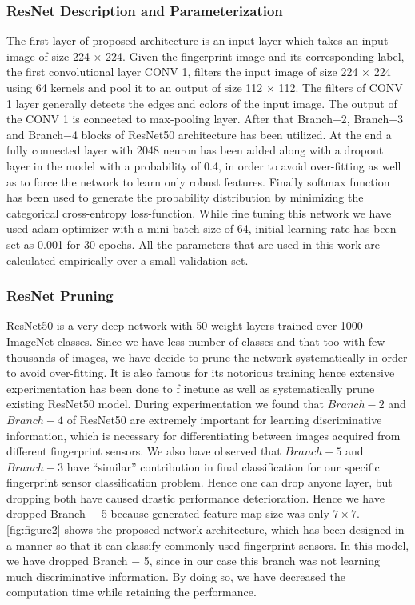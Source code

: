 \subsubsection{ResNet Description and Parameterization}
The first layer of proposed architecture is an input layer which takes an input image of size 224 $\times$ 224. Given the fingerprint image and its corresponding label, the first convolutional layer CONV 1, filters the input image of size 224 $\times$ 224 using 64 kernels and pool it to an output of size 112 $\times$ 112. The filters of CONV 1 layer generally detects the edges and colors of the input image. The output of the CONV 1 is connected to max-pooling layer. After that Branch−2, Branch−3 and Branch−4 blocks of ResNet50 architecture has been utilized. At the end a fully connected layer with 2048 neuron has been added along with a dropout layer in the model with a probability of 0.4, in order to avoid over-fitting as well as to force the network to learn only robust features. Finally softmax function has been used to generate the probability distribution by minimizing the categorical cross-entropy loss-function. While fine tuning this network we have used adam optimizer with a mini-batch size of 64, initial learning rate has been set as 0.001 for 30 epochs. All the parameters that are used in this work are calculated empirically over a small validation set.

\subsubsection{ResNet Pruning}
ResNet50 is a very deep network with 50 weight layers trained over 1000 ImageNet classes. Since we have less number of classes and that too with few thousands of images, we have decide to prune the network systematically in order to avoid over-fitting. It is also famous for its notorious training hence extensive experimentation has been done to f inetune as well as systematically prune existing ResNet50 model. During experimentation we found that $Branch−2$ and $Branch−4$ of ResNet50 are extremely important for learning discriminative information, which is necessary for differentiating between images acquired from different fingerprint sensors. We also
have observed that $Branch−5$ and $Branch−3$ have “similar” contribution in final classification for our specific fingerprint sensor classification problem. Hence one can drop anyone layer, but dropping both have caused drastic performance deterioration. Hence we have dropped Branch − 5 because generated feature map size was only $7 \times 7$. \ref{fig:figure2} shows the proposed network architecture, which has been designed in a manner so that it can classify commonly used fingerprint sensors. In this model, we have dropped Branch − 5, since in our case this branch was not learning much discriminative information. By doing so, we have decreased the computation time while retaining the performance.

